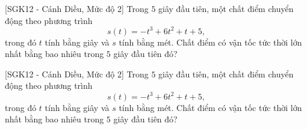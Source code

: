 \begin{bt}%
[SGK12 - Cánh Diều, Mức độ 2]%
	Trong $5$ giây đầu tiên, một chất điểm chuyển động theo phương trình $$s(t)=-t^3+6t^2+t+5,$$ trong đó $t$ tính bằng giây và $s$ tính bằng mét. Chất điểm có vận tốc tức thời lớn nhất bằng bao nhiêu trong $5$ giây đầu tiên đó?
\end{bt}

\begin{bt}%
[SGK12 - Cánh Diều, Mức độ 2]%
	Trong $5$ giây đầu tiên, một chất điểm chuyển động theo phương trình $$s(t)=-t^3+6t^2+t+5,$$ trong đó $t$ tính bằng giây và $s$ tính bằng mét. Chất điểm có vận tốc tức thời lớn nhất bằng bao nhiêu trong $5$ giây đầu tiên đó?
\end{bt}

